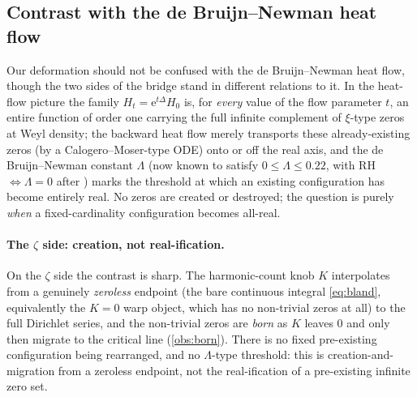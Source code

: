 \documentclass[11pt]{article}
\theoremstyle{definition}
\newcommand{\eu}{\mathrm{e}}
\begin{document}
\subsection{Contrast with the de Bruijn--Newman heat flow}
Our deformation should not be confused with the de Bruijn--Newman heat flow,
though the two sides of the bridge stand in different relations to it. In the
heat-flow picture the family $H_t = \eu^{t\Delta}H_0$ is, for \emph{every} value
of the flow parameter $t$, an entire function of order one carrying the full
infinite complement of $\xi$-type zeros at Weyl density; the backward heat flow
merely transports these already-existing zeros (by a Calogero--Moser-type ODE)
onto or off the real axis, and the de Bruijn--Newman constant $\Lambda$ (now known
to satisfy $0\le\Lambda\le 0.22$, with RH $\Longleftrightarrow\Lambda=0$ after
\citealp{RodgersTao2020,Polymath2019DBN}) marks the threshold at which an existing
configuration has become entirely real. No zeros are created or destroyed; the
question is purely \emph{when} a fixed-cardinality configuration becomes all-real.

\paragraph{The $\zeta$ side: creation, not real-ification.}
On the $\zeta$ side the contrast is sharp. The harmonic-count knob $K$ interpolates
from a genuinely \emph{zeroless} endpoint (the bare continuous integral
\eqref{eq:bland}, equivalently the $K=0$ warp object, which has no non-trivial
zeros at all) to the full Dirichlet series, and the non-trivial zeros are
\emph{born} as $K$ leaves $0$ and only then migrate to the critical line
(\cref{obs:born}). There is no fixed pre-existing configuration being rearranged,
and no $\Lambda$-type threshold: this is creation-and-migration from a zeroless
endpoint, not the real-ification of a pre-existing infinite zero set.
\end{document}
